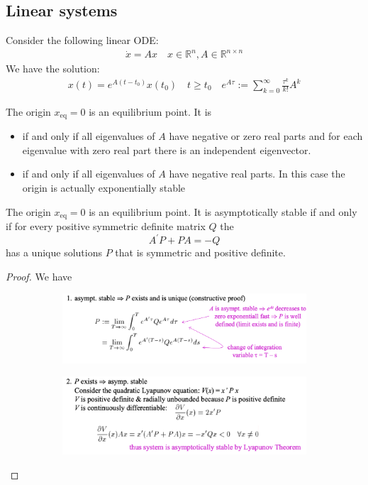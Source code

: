 \documentclass{article}
\begin{document}
\subsection{Linear systems}
Consider the following linear ODE:
\begin{align*}
\dot{x}=A x \quad x \in \mathbb{R}^{n}, A \in \mathbb{R}^{n \times n}
\end{align*}
We have the solution:
\begin{align*}
x(t)=e^{A\left(t-t_{0}\right)} x\left(t_{0}\right) \quad t \geq t_{0} \quad e^{A \tau}:=\sum_{k=0}^{\infty} \frac{\tau^{k}}{k !} A^{k}
\end{align*}
\begin{thma}
The origin $x_{\mathrm{eq}}=0$ is an equilibrium point. It is
\begin{itemize}
    \item {} if and only if all eigenvalues of $A$ have negative or zero real parts and for each eigenvalue with zero real part there is an independent eigenvector.
    \item {} if and only if all eigenvalues of $A$ have negative real parts. In this case the origin is actually exponentially stable
\end{itemize} 
\end{thma}
\begin{thma}
The origin $x_{\mathrm{eq}}=0$ is an equilibrium point. It is asymptotically stable if and only if for every positive symmetric definite matrix $Q$ the 
$$A^{\prime} P+P A=-Q$$
has a unique solutions $P$ that is symmetric and positive definite.
\end{thma}
\begin{proof}
We have 
\begin{figure}[H]
     \centering
     \begin{subfigure}[b]{0.8\textwidth}
         \centering
         \includegraphics[width=\textwidth]{Figs/10.png}
     \end{subfigure}
     \vfill
     \begin{subfigure}[b]{0.8\textwidth}
         \centering
         \includegraphics[width=\textwidth]{Figs/11.png}
     \end{subfigure}
\end{figure}
\end{proof}
\end{document}
